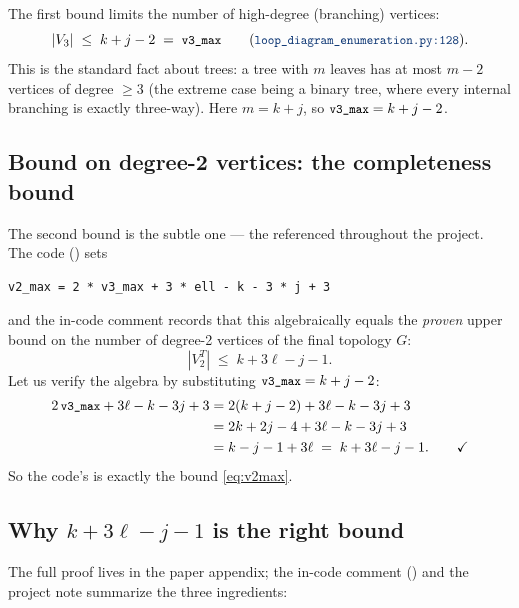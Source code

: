The first bound limits the number of high-degree (branching) vertices:
\begin{equation}
  |V_3| \;\le\; k + j - 2 \;=\; \code{v3\_max}
  \qquad (\file{loop\_diagram\_enumeration.py:128}).
  \label{eq:v3max}
\end{equation}
This is the standard fact about trees: a tree with $m$ leaves has at most $m-2$
vertices of degree $\ge 3$ (the extreme case being a binary tree, where every
internal branching is exactly three-way). Here $m = k+j$, so $\texttt{\small v3\_max} =
k+j-2$.

\subsection{Bound on degree-2 vertices: the completeness bound}

The second bound is the subtle one --- the 
referenced throughout the project. The code
() sets
\begin{lstlisting}
v2_max = 2 * v3_max + 3 * ell - k - 3 * j + 3
\end{lstlisting}
and the in-code comment records that this algebraically equals the \emph{proven}
upper bound on the number of degree-2 vertices of the final topology $G$:
\begin{equation}
  |V_2^{T}| \;\le\; k + 3\ell - j - 1.
  \label{eq:v2max}
\end{equation}
Let us verify the algebra by substituting $\texttt{\small v3\_max}=k+j-2$:
\begin{align*}
  2\,\texttt{\small v3\_max} + 3\ell - k - 3j + 3
   &= 2(k+j-2) + 3\ell - k - 3j + 3 \\
   &= 2k + 2j - 4 + 3\ell - k - 3j + 3 \\
   &= k - j - 1 + 3\ell \;=\; k + 3\ell - j - 1. \qquad\checkmark
\end{align*}
So the code's  is exactly the bound \eqref{eq:v2max}.

\subsection{Why \texorpdfstring{$k+3\ell-j-1$}{k+3l-j-1} is the right bound}

The full proof lives in the paper appendix; the in-code comment
() and the project note
 summarize the three ingredients:

